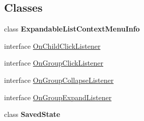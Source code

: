 \subsection*{Classes}
\begin{DoxyCompactItemize}
\item 
class {\bfseries Expandable\+List\+Context\+Menu\+Info}
\item 
interface \hyperlink{interfaceit_1_1sephiroth_1_1android_1_1library_1_1widget_1_1_expandable_h_list_view_1_1_on_child_click_listener}{On\+Child\+Click\+Listener}
\item 
interface \hyperlink{interfaceit_1_1sephiroth_1_1android_1_1library_1_1widget_1_1_expandable_h_list_view_1_1_on_group_click_listener}{On\+Group\+Click\+Listener}
\item 
interface \hyperlink{interfaceit_1_1sephiroth_1_1android_1_1library_1_1widget_1_1_expandable_h_list_view_1_1_on_group_collapse_listener}{On\+Group\+Collapse\+Listener}
\item 
interface \hyperlink{interfaceit_1_1sephiroth_1_1android_1_1library_1_1widget_1_1_expandable_h_list_view_1_1_on_group_expand_listener}{On\+Group\+Expand\+Listener}
\item 
class {\bfseries Saved\+State}
\end{DoxyCompactItemize}
